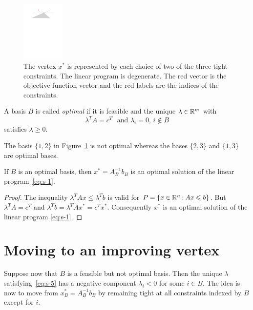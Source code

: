     \begin{figure}
      \centering
      \includegraphics[height=3cm]{figures/Degenerate.pdf}
      \caption{The vertex $x^*$ is represented by each choice of two of the three tight constraints. The linear program is degenerate. The red vector is the objective function vector and the red labels are the indices of the constraints.}
      \label{fig:7}
    \end{figure}



    \begin{definition}
      \label{def:s-2}
       A basis $B$ is called \emph{optimal} if it is feasible and the
       unique $\lambda \in \mathbb{R}^m$ 
       with 
       \begin{equation}
         \label{eq:s-5}
         \lambda^T A =  c^T \, \, \text{ and } \lambda_i = 0, \, i \notin B 
       \end{equation}
       satisfies $\lambda\geq0$. 
     \end{definition}


The basis $\{1,2\}$ in Figure~\ref{fig:7} is not optimal whereas the bases $\{2,3\}$ and $\{1,3\}$ are optimal bases. 


\begin{theorem}
  \label{thr:s-4}
  If $B$ is an optimal basis, then $x^* = A_B^{-1} b_B$ is an optimal solution of the linear program~\eqref{eq:s-1}. 
\end{theorem}

\begin{proof}
  The inequality $\lambda^T A x \leq \lambda^T b$ is valid for $P = \{x \in \mathbb{R}^n \colon Ax \leqslant b\}$. But $\lambda^T A =c^T$ and $\lambda^T b = \lambda^T Ax^* = c^Tx^*$. Consequently $x^*$ is an optimal solution of the linear program \eqref{eq:s-1}. 
\end{proof}


\section{Moving to an improving vertex}
\label{sec:moving-an-improving}

Suppose now that $B$ is a feasible but not optimal basis. Then the
unique $\lambda$ satisfying~\eqref{eq:s-5} has a negative component
$\lambda_i<0$ for some $i \in B$. The idea is now to move from $x^*_B
= A_B^{-1}b_B$ by remaining tight at all constraints indexed by $B$
except for $i$.

